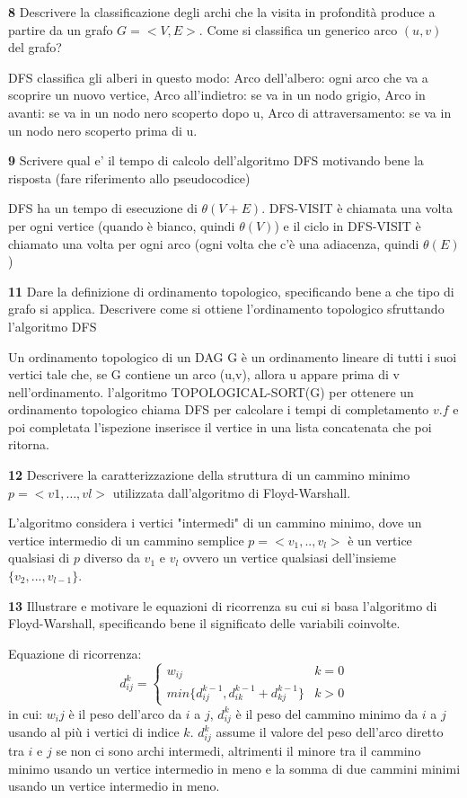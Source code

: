 \documentclass[12pt, a4paper, openany]{book}
\newcommand{\domanda}[2]{\begin{box_domanda}\textbf{#1} #2\end{box_domanda}}
\newcommand{\risposta}[1]{#1}
\begin{document}
\domanda{8}{
Descrivere la classificazione degli archi che la visita in profondità produce a partire da un grafo $G=<V,E>$.
Come si classifica un generico arco $(u,v)$ del grafo?
}
\risposta{
DFS classifica gli alberi in questo modo:
Arco dell'albero: ogni arco che va a scoprire un nuovo vertice,
Arco all'indietro: se va in un nodo grigio,
Arco in avanti: se va in un nodo nero scoperto dopo u,
Arco di attraversamento: se va in un nodo nero scoperto prima di u.
}
\domanda{9}{
Scrivere qual e’ il tempo di calcolo dell’algoritmo DFS motivando bene la
risposta (fare riferimento allo pseudocodice)}
\risposta{
DFS ha un tempo di esecuzione di $\theta(V+E)$.
DFS-VISIT è chiamata una volta per ogni vertice (quando è bianco, quindi $\theta(V)$)
e il ciclo in DFS-VISIT è chiamato una volta per ogni arco (ogni volta che c'è una adiacenza, quindi $\theta(E)$)
}
\domanda{11}{
Dare la definizione di ordinamento topologico, specificando bene a che tipo di
grafo si applica. Descrivere come si ottiene l’ordinamento topologico
sfruttando l’algoritmo DFS
}
\risposta{
Un ordinamento topologico di un DAG G è un ordinamento lineare di tutti i suoi vertici tale che, se G contiene un arco (u,v), allora u appare prima di v nell'ordinamento.
l'algoritmo TOPOLOGICAL-SORT(G) per ottenere un ordinamento topologico chiama DFS per calcolare i tempi di completamento $v.f$ e poi completata l'ispezione inserisce il vertice in una lista concatenata che poi ritorna.
}

\domanda{12}{
Descrivere la caratterizzazione della struttura di un cammino minimo $p=< v1, …, vl>$ utilizzata dall’algoritmo di Floyd-Warshall.
}
\risposta{
L'algoritmo considera i vertici "intermedi" di un cammino minimo, dove un vertice intermedio di un cammino semplice $p=<v_1,..,v_l>$ 
è un vertice qualsiasi di $p$ diverso da $v_1$ e $v_l$ ovvero un vertice qualsiasi dell'insieme $\{v_2,...,v_{l-1}\}$.
}
\domanda{13}{
Illustrare e motivare le equazioni di ricorrenza su cui si basa l’algoritmo di
Floyd-Warshall, specificando bene il significato delle variabili coinvolte.}
\risposta{
    Equazione di ricorrenza:
    \begin{equation*}
        d_{ij}^k = \begin{cases}
            w_{ij}                                        & k=0 \\
            min\{d_{ij}^{k-1},d_{ik}^{k-1} + d_{kj}^{k-1}\} & k>0
        \end{cases}
    \end{equation*}
    in cui: $w_ij$ è il peso dell'arco da $i$ a $j$, $d_{ij}^k$ è il peso del cammino minimo da $i$ a $j$ usando al più i vertici di indice $k$.
    $d_{ij}^k$ assume il valore del peso dell'arco diretto tra $i$ e $j$ se non ci sono archi intermedi, altrimenti il minore tra il cammino minimo usando un vertice intermedio in meno e la somma di due cammini minimi usando un vertice intermedio in meno.
}
\end{document}
